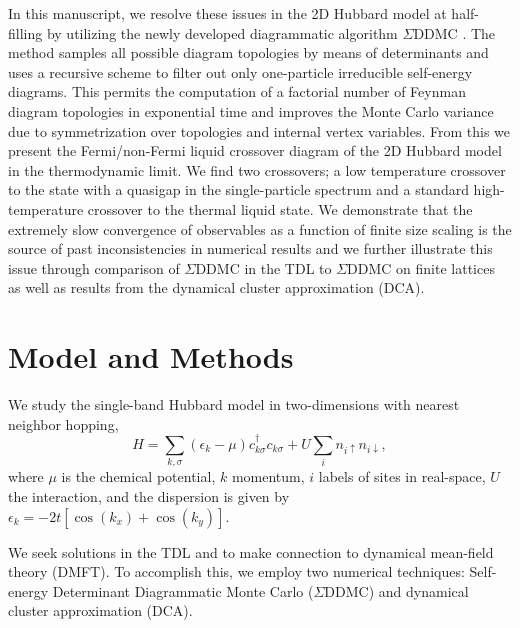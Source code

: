 \documentclass[twocolumn,notitlepage,prl,superscriptaddress,showpacs]{revtex4-1}
\begin{document}
 In this manuscript, we resolve these issues in the 2D Hubbard model at half-filling by utilizing the newly developed diagrammatic algorithm $\Sigma$DDMC \cite{simkovic2017determinant}. The method samples all possible diagram topologies by means of determinants \cite{burovski2006critical} and uses a recursive scheme \cite{rossi2017determinant} to filter out only one-particle irreducible self-energy diagrams. This permits the computation of a factorial number of Feynman diagram topologies in exponential time and improves the Monte Carlo variance due to symmetrization over topologies and internal vertex variables. From this we present the Fermi/non-Fermi liquid crossover diagram of the 2D Hubbard model in the thermodynamic limit. 
 We find two crossovers; a low temperature crossover to the state with a quasigap in the single-particle spectrum and a standard high-temperature crossover to the thermal liquid state. We demonstrate that the extremely slow convergence of observables as a function of finite size scaling is the source of past inconsistencies in numerical results\cite{vanloon:2018} and we further illustrate this issue through comparison of $\Sigma$DDMC in the TDL to $\Sigma$DDMC on finite lattices as well as results from the dynamical cluster approximation (DCA).

\section{Model and Methods}

 We study the single-band Hubbard model in two-dimensions with nearest neighbor hopping,
\begin{equation}
H = \sum_{k,\sigma} \left(\epsilon_{k} -\mu\right)c_{k\sigma}^\dagger c_{k\sigma}+U\sum_i n_{i\uparrow}n_{i\downarrow},
\label{H}
\end{equation}
where $\mu$ is the chemical potential, $k$ momentum, $i$ labels of sites in real-space, $U$ the interaction, and the dispersion is given by
$\epsilon_k=-2t\left[\cos(k_x)+\cos(k_y)\right].$

 We seek solutions in the TDL and to make connection to dynamical mean-field theory (DMFT). To accomplish this, we employ two numerical techniques: Self-energy Determinant Diagrammatic Monte Carlo ($\Sigma$DDMC) and dynamical cluster approximation (DCA). 
\end{document}
